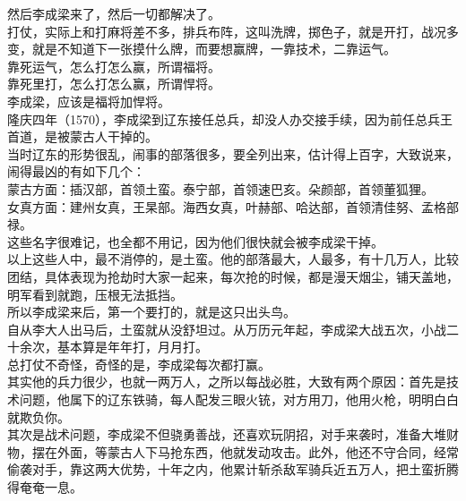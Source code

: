 \begin{multicols}{\theparacolNo}
然后李成梁来了，然后一切都解决了。\\

打仗，实际上和打麻将差不多，排兵布阵，这叫洗牌，掷色子，就是开打，战况多变，就是不知道下一张摸什么牌，而要想赢牌，一靠技术，二靠运气。\\

靠死运气，怎么打怎么赢，所谓福将。\\

靠死里打，怎么打怎么赢，所谓悍将。\\

李成梁，应该是福将加悍将。\\

隆庆四年（1570），李成梁到辽东接任总兵，却没人办交接手续，因为前任总兵王首道，是被蒙古人干掉的。\\

当时辽东的形势很乱，闹事的部落很多，要全列出来，估计得上百字，大致说来，闹得最凶的有如下几个：\\

蒙古方面：插汉部，首领土蛮。泰宁部，首领速巴亥。朵颜部，首领董狐狸。\\

女真方面：建州女真，王杲部。海西女真，叶赫部、哈达部，首领清佳努、孟格部禄。\\

这些名字很难记，也全都不用记，因为他们很快就会被李成梁干掉。\\

以上这些人中，最不消停的，是土蛮。他的部落最大，人最多，有十几万人，比较团结，具体表现为抢劫时大家一起来，每次抢的时候，都是漫天烟尘，铺天盖地，明军看到就跑，压根无法抵挡。\\

所以李成梁来后，第一个要打的，就是这只出头鸟。\\

自从李大人出马后，土蛮就从没舒坦过。从万历元年起，李成梁大战五次，小战二十余次，基本算是年年打，月月打。\\

总打仗不奇怪，奇怪的是，李成梁每次都打赢。\\

其实他的兵力很少，也就一两万人，之所以每战必胜，大致有两个原因：首先是技术问题，他属下的辽东铁骑，每人配发三眼火铳，对方用刀，他用火枪，明明白白就欺负你。\\

其次是战术问题，李成梁不但骁勇善战，还喜欢玩阴招，对手来袭时，准备大堆财物，摆在外面，等蒙古人下马抢东西，他就发动攻击。此外，他还不守合同，经常偷袭对手，靠这两大优势，十年之内，他累计斩杀敌军骑兵近五万人，把土蛮折腾得奄奄一息。\\


\end{multicols}
